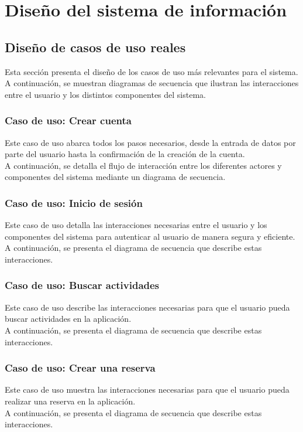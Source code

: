 \chapter{Diseño del sistema de información}
\section{Diseño de casos de uso reales}
Esta sección presenta el diseño de los casos de uso más relevantes para el sistema. A continuación, se muestran diagramas de secuencia que ilustran las interacciones entre el usuario y los distintos componentes del sistema.
\subsection{Caso de uso: Crear cuenta}
Este caso de uso abarca todos los pasos necesarios, desde la entrada de datos por parte del usuario hasta la confirmación de la creación de la cuenta.
\\[1ex]A continuación, se detalla el flujo de interacción entre los diferentes actores y componentes del sistema mediante un diagrama de secuencia.

\subsection{Caso de uso: Inicio de sesión}
Este caso de uso detalla las interacciones necesarias entre el usuario y los componentes del sistema para autenticar al usuario de manera segura y eficiente.
\\[1ex]A continuación, se presenta el diagrama de secuencia que describe estas interacciones.

\subsection{Caso de uso: Buscar actividades}
Este caso de uso describe las interacciones necesarias para que el usuario pueda buscar actividades en la aplicación.
\\[1ex]A continuación, se presenta el diagrama de secuencia que describe estas interacciones.

\subsection{Caso de uso: Crear una reserva}
Este caso de uso muestra las interacciones necesarias para que el usuario pueda realizar una reserva en la aplicación.
\\[1ex]A continuación, se presenta el diagrama de secuencia que describe estas interacciones.

% 
